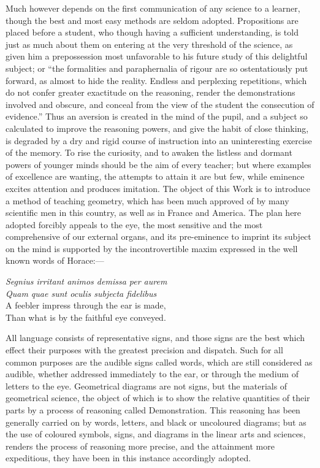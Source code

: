 \documentclass{byrne-book}
\begin{document}
Much however depends on the first communication of any science to a learner, though the best and most easy methods are seldom adopted. Propositions are placed before a student, who though having a sufficient understanding, is told just as much about them on entering at the very threshold of the science, as given him a prepossession most unfavorable to his future study of this delightful subject; or \enquote{the formalities and paraphernalia of rigour are so ostentatiously put forward, as almost to hide the reality. Endless and perplexing repetitions, which do not confer greater exactitude on the reasoning, render the demonstrations involved and obscure, and conceal from the view of the student the consecution of evidence.} %
Thus an aversion is created in the mind of the pupil, and a subject so calculated to improve the reasoning powers, and give the habit of close thinking, is degraded by a dry and rigid course of instruction into an uninteresting exercise of the memory. To rise the curiosity, and to awaken the listless and dormant powers of younger minds should be the aim of every teacher; but where examples of excellence are wanting, the attempts to attain it are but few, while eminence excites attention and produces imitation. The object of this Work is to introduce a method of teaching geometry, which has been much approved of by many scientific men in this country, as well as in France and America. The plan here adopted forcibly appeals to the eye, the most sensitive and the most comprehensive of our external organs, and its pre-eminence to imprint its subject on the mind is supported by the incontrovertible maxim expressed in the well known words of Horace:—

\begin{center}
\emph{Segnius irritant animos demissa per aurem\\
Quam quae sunt oculis subjecta fidelibus}\\
\baselineskip
A feebler impress through the ear is made,\\
Than what is by the faithful eye conveyed.
\end{center}

All language consists of representative signs, and those signs are the best which effect their purposes with the greatest precision and dispatch. Such for all common purposes are the audible signs called words, which are still considered as audible, whether addressed immediately to the ear, or through the medium of letters to the eye. Geometrical diagrams are not signs, but the materials of geometrical science, the object of which is to show the relative quantities of their parts by a process of reasoning called Demonstration. This reasoning has been generally carried on by words, letters, and black or uncoloured diagrams; but as the use of coloured symbols, signs, and diagrams in the linear arts and sciences, renders the process of reasoning more precise, and the attainment more expeditious, they have been in this instance accordingly adopted.
\end{document}

